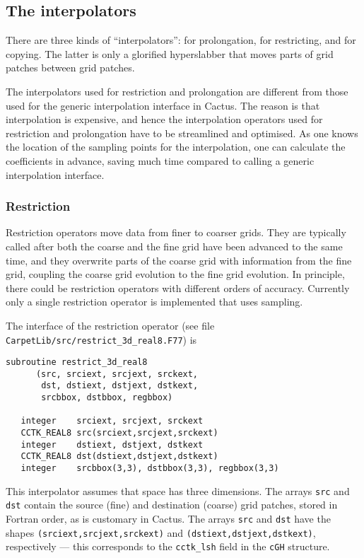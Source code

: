 \documentclass{article}
\begin{document}
\subsection{The interpolators}

   There are three kinds of ``interpolators'': for prolongation, for
   restricting, and for copying.  The latter is only a glorified
   hyperslabber that moves parts of grid patches between grid patches.

   The interpolators used for restriction and prolongation are
   different from those used for the generic interpolation interface
   in Cactus.  The reason is that interpolation is expensive, and
   hence the interpolation operators used for restriction and
   prolongation have to be streamlined and optimised.  As one knows
   the location of the sampling points for the interpolation, one can
   calculate the coefficients in advance, saving much time compared to
   calling a generic interpolation interface.



\subsubsection{Restriction}

   Restriction operators move data from finer to coarser grids.  They
   are typically called after both the coarse and the fine grid have
   been advanced to the same time, and they overwrite parts of the
   coarse grid with information from the fine grid, coupling the
   coarse grid evolution to the fine grid evolution.  In principle,
   there could be restriction operators with different orders of
   accuracy.  Currently only a single restriction operator is
   implemented that uses sampling.

   The interface of the restriction operator (see file
   \texttt{CarpetLib/src/restrict\_3d\_real8.F77}) is
\begin{verbatim}
subroutine restrict_3d_real8
      (src, srciext, srcjext, srckext,
       dst, dstiext, dstjext, dstkext,
       srcbbox, dstbbox, regbbox)

   integer    srciext, srcjext, srckext
   CCTK_REAL8 src(srciext,srcjext,srckext)
   integer    dstiext, dstjext, dstkext
   CCTK_REAL8 dst(dstiext,dstjext,dstkext)
   integer    srcbbox(3,3), dstbbox(3,3), regbbox(3,3)
\end{verbatim}
   This interpolator assumes that space has three dimensions.  The
   arrays \texttt{src} and \texttt{dst} contain the source (fine) and
   destination (coarse) grid patches, stored in Fortran order, as is
   customary in Cactus.  The arrays \texttt{src} and \texttt{dst} have
   the shapes \texttt{(srciext,srcjext,srckext)} and
   \texttt{(dstiext,dstjext,dstkext)}, respectively --- this
   corresponds to the \texttt{cctk\_lsh} field in the \texttt{cGH}
   structure.
\end{document}
